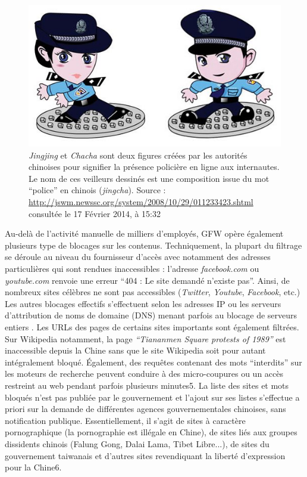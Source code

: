 \begin{figure}[h]
    \centering
    \includegraphics{figures/chap1/jingcha.jpg}
    \caption[Jingjing et Chacha, les policiers de l'Internet chinois]{\textit{Jingjing} et \textit{Chacha} sont deux figures créées par les autorités chinoises pour signifier la présence policière en ligne aux internautes. Le nom de ces veilleurs dessinés est une composition issue du mot “police” en chinois (\textit{jingcha}). Source : \url{http://jswm.newssc.org/system/2008/10/29/011233423.shtml} consultée le 17 Février 2014, à 15:32}
    \label{fig:jingcha}
\end{figure}


Au-delà de l’activité manuelle de milliers d’employés, GFW opère également plusieurs type de blocages sur les contenus. Techniquement, la plupart du filtrage se déroule au niveau du fournisseur d’accès avec notamment des adresses particulières qui sont rendues inaccessibles : l’adresse \textit{facebook.com} ou \textit{youtube.com} renvoie une erreur “404 : Le site demandé n’existe pas”. Ainsi, de nombreux sites célèbres ne sont pas accessibles (\textit{Twitter}, \textit{Youtube}, \textit{Facebook}, etc.) Les autres blocages effectifs s’effectuent selon les adresses IP ou les serveurs d’attribution de noms de domaine (DNS) menant parfois au blocage de serveurs entiers \citep{Winter2012}. Les URLs des pages de certains sites importants sont également filtrées. Sur Wikipedia notamment, la page \textit{“Tiananmen Square protests of 1989”} est inaccessible depuis la Chine sans que le site Wikipedia soit pour autant intégralement bloqué. Également, des requêtes contenant des mots “interdits” sur les moteurs de recherche peuvent conduire à des micro-coupures ou un accès restreint au web pendant parfois plusieurs minutes5. La liste des sites et mots bloqués n’est pas publiée par le gouvernement et l’ajout sur ses listes s’effectue a priori sur la demande de différentes agences gouvernementales chinoises, sans notification publique. Essentiellement, il s’agit de sites à caractère pornographique (la pornographie est illégale en Chine), de sites liés aux groupes dissidents chinois (Falung Gong, Dalai Lama, Tibet Libre...), de sites du gouvernement taiwanais et d’autres sites revendiquant la liberté d’expression pour la Chine6.

